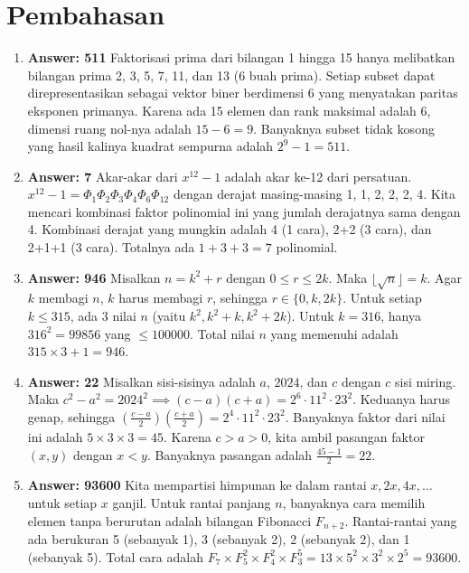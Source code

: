 \documentclass{scrartcl}
\begin{document}
\section*{Pembahasan}

\begin{enumerate}

\item \textbf{Answer: 511} Faktorisasi prima dari bilangan 1 hingga 15 hanya melibatkan bilangan prima 2, 3, 5, 7, 11, dan 13 (6 buah prima). Setiap subset dapat direpresentasikan sebagai vektor biner berdimensi 6 yang menyatakan paritas eksponen primanya. Karena ada 15 elemen dan rank maksimal adalah 6, dimensi ruang nol-nya adalah $15 - 6 = 9$. Banyaknya subset tidak kosong yang hasil kalinya kuadrat sempurna adalah $2^9 - 1 = 511$.

\item  \textbf{Answer: 7} Akar-akar dari $x^{12}-1$ adalah akar ke-12 dari persatuan. $x^{12}-1 = \Phi_1 \Phi_2 \Phi_3 \Phi_4 \Phi_6 \Phi_{12}$ dengan derajat masing-masing 1, 1, 2, 2, 2, 4. Kita mencari kombinasi faktor polinomial ini yang jumlah derajatnya sama dengan 4. Kombinasi derajat yang mungkin adalah 4 (1 cara), 2+2 (3 cara), dan 2+1+1 (3 cara). Totalnya ada $1 + 3 + 3 = 7$ polinomial.

\item  \textbf{Answer: 946} Misalkan $n = k^2 + r$ dengan $0 \le r \le 2k$. Maka $\lfloor \sqrt{n} \rfloor = k$. Agar $k$ membagi $n$, $k$ harus membagi $r$, sehingga $r \in \{0, k, 2k\}$. Untuk setiap $k \le 315$, ada 3 nilai $n$ (yaitu $k^2, k^2+k, k^2+2k$). Untuk $k = 316$, hanya $316^2 = 99856$ yang $\le 100000$. Total nilai $n$ yang memenuhi adalah $315 \times 3 + 1 = 946$.

\item  \textbf{Answer: 22} Misalkan sisi-sisinya adalah $a$, $2024$, dan $c$ dengan $c$ sisi miring. Maka $c^2 - a^2 = 2024^2 \implies (c-a)(c+a) = 2^6 \cdot 11^2 \cdot 23^2$. Keduanya harus genap, sehingga $\left(\frac{c-a}{2}\right)\left(\frac{c+a}{2}\right) = 2^4 \cdot 11^2 \cdot 23^2$. Banyaknya faktor dari nilai ini adalah $5 \times 3 \times 3 = 45$. Karena $c > a > 0$, kita ambil pasangan faktor $(x, y)$ dengan $x < y$. Banyaknya pasangan adalah $\frac{45 - 1}{2} = 22$.

\item  \textbf{Answer: 93600} Kita mempartisi himpunan ke dalam rantai $x, 2x, 4x, \dots$ untuk setiap $x$ ganjil. Untuk rantai panjang $n$, banyaknya cara memilih elemen tanpa berurutan adalah bilangan Fibonacci $F_{n+2}$. Rantai-rantai yang ada berukuran 5 (sebanyak 1), 3 (sebanyak 2), 2 (sebanyak 2), dan 1 (sebanyak 5). Total cara adalah $F_7 \times F_5^2 \times F_4^2 \times F_3^5 = 13 \times 5^2 \times 3^2 \times 2^5 = 93600$.


\end{enumerate}
\end{document}
